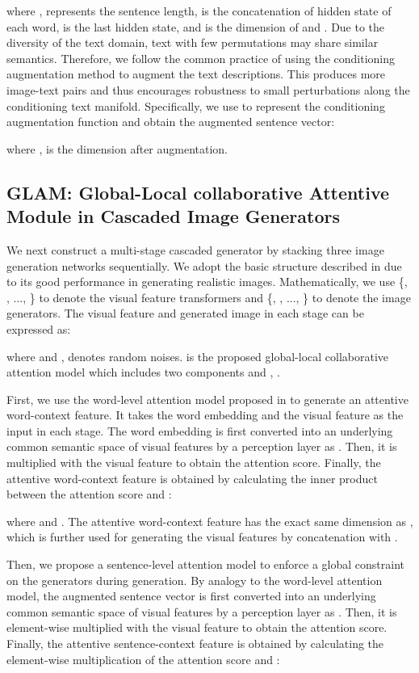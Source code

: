 \documentclass[10pt,twocolumn,letterpaper]{article}
\begin{document}
where ,  represents the sentence length,  is the concatenation of hidden state  of each word,  is the last hidden state, and  is the dimension of  and .
Due to the diversity of the text domain, text with few permutations may share similar semantics. Therefore, we follow the common practice of using the conditioning augmentation method \cite{zhang2017stackgan} to augment the text descriptions. This produces more image-text pairs and thus encourages robustness to small perturbations along the conditioning text manifold. Specifically, we use  to represent the conditioning augmentation function and obtain the augmented sentence vector: 

where ,  is the dimension after augmentation.

\subsection{GLAM: Global-Local collaborative Attentive Module in Cascaded Image Generators}
We next construct a multi-stage cascaded generator by stacking three image generation networks sequentially. We adopt the basic structure described in \cite{xu2017attngan} due to its good performance in generating realistic images. Mathematically, we use \{, , ..., \} to denote the  visual feature transformers and \{, , ..., \} to denote the  image generators. The visual feature  and generated image  in each stage can be expressed as:

where  and ,  denotes random noises.  is the proposed global-local collaborative attention model which includes two components  and ,  .

First, we use the word-level attention model proposed in \cite{xu2017attngan} to generate an attentive word-context feature. It takes the word embedding  and the visual feature  as the input in each stage. The word embedding  is first converted into an underlying common semantic space of visual features by a perception layer  as . Then, it is multiplied with the visual feature  to obtain the attention score. Finally, the attentive word-context feature is obtained by calculating the inner product between the attention score and : 

where  and . The attentive word-context feature  has the exact same dimension as , which is further used for generating the  visual features  by concatenation with .

Then, we propose a sentence-level attention model to enforce a global constraint on the generators during generation. By analogy to the word-level attention model, the augmented sentence vector  is first converted into an underlying common semantic space of visual features by a perception layer  as . Then, it is element-wise multiplied with the visual feature  to obtain the attention score. Finally, the attentive sentence-context feature is obtained by calculating the element-wise multiplication of the attention score and : 
\end{document}
